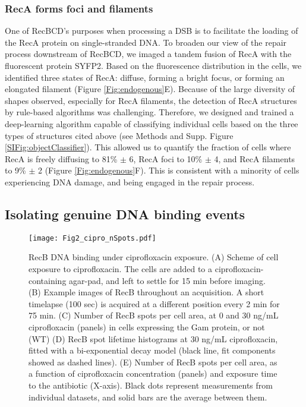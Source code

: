 \subsubsection*{RecA forms foci and filaments}
One of RecBCD's purposes when processing a DSB is to facilitate the loading of the RecA protein on single-stranded DNA. To broaden our view of the repair process downstream of RecBCD, we imaged a tandem fusion of RecA with the fluorescent protein SYFP2.\cite{} Based on the fluorescence distribution in the cells, we identified three states of RecA: diffuse, forming a bright focus, or forming an elongated filament (Figure \ref{Fig:endogenous}E). Because of the large diversity of shapes observed, especially for RecA filaments, the detection of RecA structures by rule-based algorithms was challenging. Therefore, we designed and trained a deep-learning algorithm capable of classifying individual cells based on the three types of structures cited above (see Methods and Supp. Figure \ref{SIFig:objectClassifier}). This allowed us to quantify the fraction of cells where RecA is freely diffusing to 81\% $\pm$ 6, RecA foci to 10\% $\pm$ 4, and RecA filaments to 9\% $\pm$ 2 (Figure \ref{Fig:endogenous}F). This is consistent with a minority of cells experiencing DNA damage, and being engaged in the repair process.

\subsection*{Isolating genuine DNA binding events}

\begin{figure*}[htbp]
\begin{center}
\texttt{[image: Fig2\_cipro\_nSpots.pdf]}
\end{center}
\caption{RecB DNA binding under ciprofloxacin exposure. (A) Scheme of cell exposure to ciprofloxacin. The cells are added to a ciprofloxacin-containing agar-pad, and left to settle for 15 min before imaging. (B) Example images of RecB throughout an acquisition. A short timelapse (100 sec) is acquired at a different position every 2 min for 75 min. (C) Number of RecB spots per cell area, at 0 and 30 ng/mL ciprofloxacin (panels) in cells expressing the Gam protein, or not (WT) (D) RecB spot lifetime histograms at 30 ng/mL ciprofloxacin, fitted with a bi-exponential decay model (black line, fit components showed as dashed lines). (E) Number of RecB spots per cell area, as a function of ciprofloxacin concentration (panels) and exposure time to the antibiotic (X-axis). Black dots represent measurements from individual datasets, and solid bars are the average between them.}
\label{Fig:nspots}
\end{figure*}

